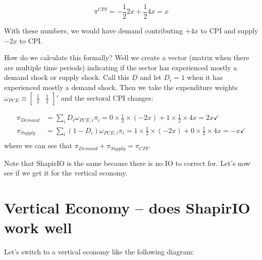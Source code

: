 \documentclass[12pt,english]{article}
\begin{document}
\[
	\pi^{CPI} = -\frac{1}{2}2x + \frac{1}{2}4x = x
\]

With these numbers, we would have demand contributing $+4x$ to CPI and supply $-2x$ to CPI.

How do we calculate this formally? Well we create a vector (matrix when there are multiple time periods) indicating if the sector has experienced mostly a demand shock or supply shock. Call this $\underline{D}$ and let $D_i=1$ when it has experienced mostly a demand shock. Then we take the expenditure weights $\omega_{PCE}\equiv \begin{bmatrix} \frac{1}{2} & \frac{1}{2}\end{bmatrix}'$ and the sectoral CPI changes:

\begin{align*}
	\pi_{Demand} &=\sum_i D_i \omega_{PCE,i} \pi_i = 0\times \frac{1}{2}\times \left(-2x\right)+ 1 \times \frac{1}{2}\times 4x = 2x\checkmark\\
	\pi_{Supply} &=\sum_i (1-D_i) \omega_{PCE,i} \pi_i = 1\times \frac{1}{2}\times \left(-2x\right)+ 0 \times \frac{1}{2}\times 4x = -x\checkmark\\	
\end{align*}
where we can see that $\pi_{Demand} + \pi_{Supply} = \pi_{CPI}$. 

Note that ShapirIO is the same because there is no IO to correct for. Let's now see if we get it for the vertical economy.

\section{Vertical Economy -- does ShapirIO work well}

Let's switch to a vertical economy like the following diagram:

\end{document}
